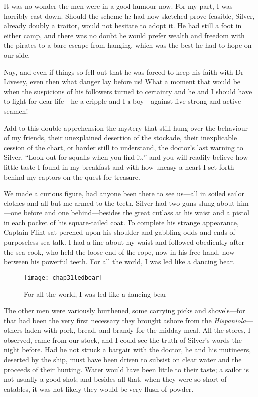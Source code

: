 It was no wonder the men were in a good humour now. For my part, I was horribly cast down. Should the scheme he had now sketched prove feasible, Silver, already doubly a traitor, would not hesitate to adopt it. He had still a foot in either camp, and there was no doubt he would prefer wealth and freedom with the pirates to a bare escape from hanging, which was the best he had to hope on our side.

Nay, and even if things so fell out that he was forced to keep his faith with Dr Livesey, even then what danger lay before us! What a moment that would be when the suspicions of his followers turned to certainty and he and I should have to fight for dear life---he a cripple and I a boy---against five strong and active seamen!

Add to this double apprehension the mystery that still hung over the behaviour of my friends, their unexplained desertion of the stockade, their inexplicable cession of the chart, or harder still to understand, the doctor’s last warning to Silver, \enquote{Look out for squalls when you find it,} and you will readily believe how little taste I found in my breakfast and with how uneasy a heart I set forth behind my captors on the quest for treasure.

We made a curious figure, had anyone been there to see us---all in soiled sailor clothes and all but me armed to the teeth. Silver had two guns slung about him---one before and one behind---besides the great cutlass at his waist and a pistol in each pocket of his square-tailed coat. To complete his strange appearance, Captain Flint sat perched upon his shoulder and gabbling odds and ends of purposeless sea-talk. I had a line about my waist and followed obediently after the sea-cook, who held the loose end of the rope, now in his free hand, now between his powerful teeth. For all the world, I was led like a dancing bear.

\begin{sidewaysfigure}
\texttt{[image: chap31ledbear]}%
\caption{For all the world, I was led like a dancing bear}
\end{sidewaysfigure} 

The other men were variously burthened, some carrying picks and shovels---for that had been the very first necessary they brought ashore from the \textit{Hispaniola}---others laden with pork, bread, and brandy for the midday meal. All the stores, I observed, came from our stock, and I could see the truth of Silver’s words the night before. Had he not struck a bargain with the doctor, he and his mutineers, deserted by the ship, must have been driven to subsist on clear water and the proceeds of their hunting. Water would have been little to their taste; a sailor is not usually a good shot; and besides all that, when they were so short of eatables, it was not likely they would be very flush of powder.

